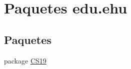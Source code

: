\hypertarget{namespaceedu_1_1ehu}{}\section{Paquetes edu.\+ehu}
\label{namespaceedu_1_1ehu}
\subsection*{Paquetes}
\begin{DoxyCompactItemize}
\item 
package \mbox{\hyperlink{namespaceedu_1_1ehu_1_1_c_s19}{C\+S19}}
\end{DoxyCompactItemize}
